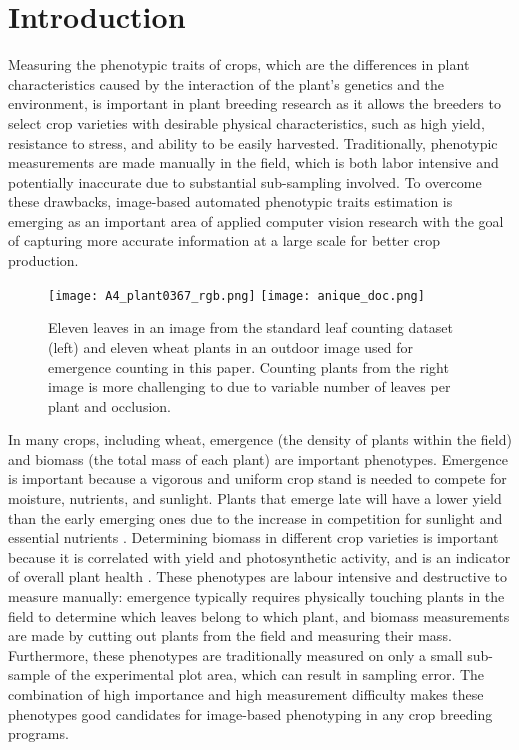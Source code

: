 \documentclass[10pt,twocolumn,letterpaper]{article}
\begin{document}

\section{Introduction}

Measuring the phenotypic traits of crops, which are the differences in plant characteristics caused by the interaction of the plant's genetics and the environment, is important in plant breeding research as it allows the breeders to select crop varieties with desirable physical characteristics, such as high yield, resistance to stress, and ability to be easily harvested. Traditionally, phenotypic measurements are made manually in the field, which is both labor intensive and potentially inaccurate due to substantial sub-sampling involved. To overcome these drawbacks, image-based automated phenotypic traits estimation is emerging as an important area of applied computer vision research with the goal of capturing more accurate information at a large scale for better crop production.

\begin{figure}[t!]
\centering
	\texttt{[image: A4\_plant0367\_rgb.png]}
	\texttt{[image: anique\_doc.png]}
    \caption{Eleven leaves in an image from the standard leaf counting dataset \cite{dataset-cvppp2017-03} (left) and eleven wheat plants in an outdoor image used for emergence counting in this paper. Counting plants from the right image is more challenging to due to variable number of leaves per plant and  occlusion.}
    \label{fig:emergence_difficult}
\end{figure}

In many crops, including wheat, emergence (the density of plants within the field) and biomass (the total mass of each plant) are important phenotypes. Emergence is important because a vigorous and uniform crop stand is needed to compete for moisture, nutrients, and sunlight. Plants that emerge late will have a lower yield than the early emerging ones due to the increase in competition for sunlight and essential nutrients \cite{lawles2012}. Determining biomass in different crop varieties is important because it is correlated with yield \cite{soriano2017}
and photosynthetic activity, and is an indicator of overall plant health \cite{dai2016}.
%
These phenotypes are labour intensive and destructive to measure manually: emergence typically requires physically touching plants in the field to determine which leaves belong to which plant, and biomass measurements are made by cutting out plants from the field and measuring their mass. Furthermore, these phenotypes are traditionally measured on only a small sub-sample of the experimental plot area, which can result in sampling error. The combination of high importance and high measurement difficulty makes these phenotypes good candidates for image-based phenotyping in any crop breeding programs.
\end{document}
